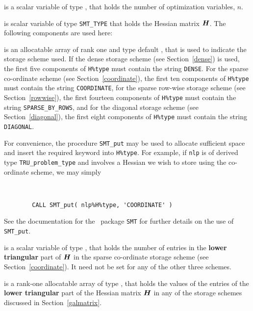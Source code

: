 \documentclass{galahad}
\newcommand{\packagename}{TRU}
\begin{document}
\begin{description}

 is a scalar variable of type \integer,
 that holds the number of optimization variables, $n$.

 is scalar variable of type {\tt SMT\_TYPE}
that holds the Hessian matrix ${\bm{H}}$. The following components
are used here:

\begin{description}

 is an allocatable array of rank one and type default
\character, that
is used to indicate the storage scheme used. If the dense storage scheme
(see Section~\ref{dense}) is used,
the first five components of {\tt H\%type} must contain the
string {\tt DENSE}.
For the sparse co-ordinate scheme (see Section~\ref{coordinate}),
the first ten components of {\tt H\%type} must contain the
string {\tt COORDINATE},
for the sparse row-wise storage scheme (see Section~\ref{rowwise}),
the first fourteen components of {\tt H\%type} must contain the
string {\tt SPARSE\_BY\_ROWS},
and for the diagonal storage scheme (see Section~\ref{diagonal}),
the first eight components of {\tt H\%type} must contain the
string {\tt DIAGONAL}.

For convenience, the procedure {\tt SMT\_put}
may be used to allocate sufficient space and insert the required keyword
into {\tt H\%type}.
For example, if {\tt nlp} is of derived type {\tt \packagename\_problem\_type}
and involves a Hessian we wish to store using the co-ordinate scheme,
we may simply
{\tt
\begin{verbatim}
        CALL SMT_put( nlp%H%type, 'COORDINATE' )
\end{verbatim}
}
\noindent
See the documentation for the \galahad\ package {\tt SMT}
for further details on the use of {\tt SMT\_put}.

 is a scalar variable of type \integer, that
holds the number of entries in the {\bf lower triangular} part of ${\bm{H}}$
in the sparse co-ordinate storage scheme (see Section~\ref{coordinate}).
It need not be set for any of the other three schemes.

 is a rank-one allocatable array of type \realdp, that holds
the values of the entries of the {\bf lower triangular} part
of the Hessian matrix ${\bm{H}}$ in any of the
storage schemes discussed in Section~\ref{galmatrix}.


\end{description}
\end{description}
\end{document}
